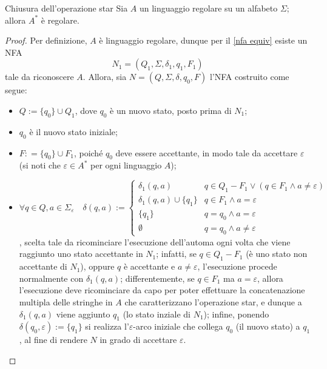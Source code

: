\documentclass[a4paper, 12pt]{report}
\begin{document}
    \begin{framedprop}[label={closure star}]{Chiusura dell'operazione star}
        Sia $A$ un linguaggio regolare su un alfabeto $\Sigma$; allora $A^*$ è regolare.
    \end{framedprop}

    \begin{proof}
        Per definizione, $A$ è linguaggio regolare, dunque per il \cref{nfa equiv} esiste un NFA $$N_1 = (Q_1, \Sigma, \delta_1, q_1, F_1)$$ tale da riconoscere $A$. Allora, sia $N = (Q, \Sigma, \delta, q_0, F)$ l'NFA costruito come segue:

        \begin{itemize}
            \item $Q := \{q_0\} \cup Q_1$, dove $q_0$ è un nuovo stato, posto prima di $N_1$;
            \item $q_0$ è il nuovo stato iniziale;
            \item $F: = \{q_0\} \cup F_1$, poiché $q_0$ deve essere accettante, in modo tale da accettare $\varepsilon$ (si noti che $\varepsilon \in A^*$ per ogni linguaggio $A$);
            \item $\forall q \in Q, a \in \Sigma_\varepsilon \quad \delta(q, a) := \left \{ \begin{array}{ll} \delta_1(q, a) & q \in Q_1 - F_1 \lor (q \in F_1 \land a \neq \varepsilon) \\ \delta_1(q, a) \cup \{q_1\} & q \in F_1 \land a = \varepsilon \\ \{q_1\} & q = q_0 \land a = \varepsilon \\ \emptyset & q = q_0 \land a \neq \varepsilon \end{array} \right.$, scelta tale da ricominciare l'esecuzione dell'automa ogni volta che viene raggiunto uno stato accettante in $N_1$; infatti, se $q \in Q_1 - F_1$ (è uno stato non accettante di $N_1$), oppure $q$ è accettante e $a \neq \varepsilon$, l'esecuzione procede normalmente con $\delta_1(q, a)$; differentemente, se $q \in F_1$ ma $a = \varepsilon$, allora l'esecuzione deve ricominciare da capo per poter effettuare la concatenazione multipla delle stringhe in $A$ che caratterizzano l'operazione star, e dunque a $\delta_1(q, a)$ viene aggiunto $q_1$ (lo stato inziale di $N_1$); infine, ponendo $\delta(q_0, \varepsilon) := \{q_1\}$ si realizza l'$\varepsilon$-arco iniziale che collega $q_0$ (il nuovo stato) a $q_1$, al fine di rendere $N$ in grado di accettare $\varepsilon$.
        \end{itemize}


\end{proof}
\end{document}
